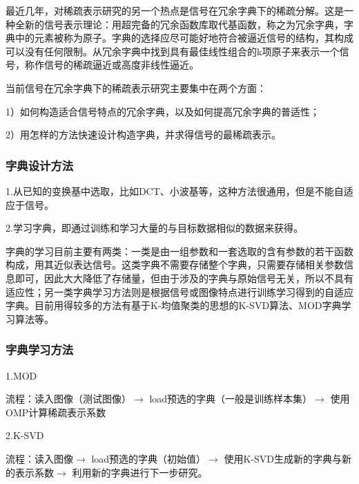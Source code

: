 \documentclass[a4paper,12pt]{article}
\begin{document}
最近几年，对稀疏表示研究的另一个热点是信号在冗余字典下的稀疏分解。这是一种全新的信号表示理论：用超完备的冗余函数库取代基函数，称之为冗余字典，字典中的元素被称为原子。字典的选择应尽可能好地符合被逼近信号的结构，其构成可以没有任何限制。从冗余字典中找到具有最佳线性组合的k项原子来表示一个信号，称作信号的稀疏逼近或高度非线性逼近。

当前信号在冗余字典下的稀疏表示研究主要集中在两个方面：

1）如何构造适合信号特点的冗余字典，以及如何提高冗余字典的普适性；

2）用怎样的方法快速设计构造字典，并求得信号的最稀疏表示。

\subsubsection{字典设计方法}

1.从已知的变换基中选取，比如DCT、小波基等，这种方法很通用，但是不能自适应于信号。

2.学习字典，即通过训练和学习大量的与目标数据相似的数据来获得。

字典的学习目前主要有两类：一类是由一组参数和一套选取的含有参数的若干函数构成，用其近似表达信号。这类字典不需要存储整个字典，只需要存储相关参数信息即可，因此大大降低了存储量，但由于涉及的字典与原始信号无关，所以不具有适应性；另一类字典学习方法则是根据信号或图像特点进行训练学习得到的自适应字典。目前用得较多的方法有基于K-均值聚类的思想的K-SVD算法、MOD字典学习算法等。

\subsubsection{字典学习方法}

1.MOD

流程：读入图像（测试图像）$\to$ load预选的字典（一般是训练样本集）$\to$ 使用OMP计算稀疏表示系数

2.K-SVD

流程：读入图像$\to$ load预选的字典（初始值）$\to$ 使用K-SVD生成新的字典与新的表示系数$\to$ 利用新的字典进行下一步研究。
\end{document}

